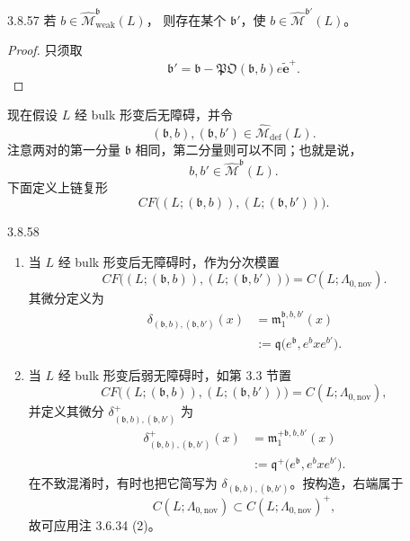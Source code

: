 \begin{corollary}{3.8.57}\label{cor:3-8-57}
若
$b\in\widehat{\mathcal M}^{\mathfrak b}_{\mathrm{weak}}(L)$，
则存在某个 $\mathfrak b'$，使
$b\in\widehat{\mathcal M}^{\mathfrak b'}(L)$。
\end{corollary}

\begin{proof}
只须取
\[
 \mathfrak b'
 =
 \mathfrak b-\mathfrak{PO}(\mathfrak b,b)e
 \widetilde{\mathbf e}^+.
\]
\end{proof}

现在假设 $L$ 经 bulk 形变后无障碍，并令
\[
 (\mathfrak b,b),(\mathfrak b,b')
 \in\widehat{\mathcal M}_{\mathrm{def}}(L).
\]
注意两对的第一分量 $\mathfrak b$ 相同，第二分量则可以不同；也就是说，
\[
 b,b'\in\widehat{\mathcal M}^{\mathfrak b}(L).
\]
下面定义上链复形
\[
 CF\bigl((L;(\mathfrak b,b)),(L;(\mathfrak b,b'))\bigr).
\]

\begin{definition}{3.8.58}\label{def:3-8-58}
\begin{enumerate}[label=\textup{(\arabic*)},leftmargin=2.8em]
\item 当 $L$ 经 bulk 形变后无障碍时，作为分次模置
\[
 CF\bigl((L;(\mathfrak b,b)),(L;(\mathfrak b,b'))\bigr)
 =
 C(L;\Lambda_{0,\mathrm{nov}}).
\]
其微分定义为
\begin{equation}
\begin{aligned}
 \delta_{(\mathfrak b,b),(\mathfrak b,b')}(x)
 &=
 \mathfrak m_1^{\mathfrak b,b,b'}(x)\\
 &:=
 \mathfrak q\bigl(
 e^{\mathfrak b},e^bxe^{b'}
 \bigr).
\end{aligned}
\tag{3.8.59.1}\label{eq:3-8-59-1}
\end{equation}

\item 当 $L$ 经 bulk 形变后弱无障碍时，如第 3.3 节置
\[
 CF\bigl((L;(\mathfrak b,b)),(L;(\mathfrak b,b'))\bigr)
 =
 C(L;\Lambda_{0,\mathrm{nov}}),
\]
并定义其微分
$\delta^+_{(\mathfrak b,b),(\mathfrak b,b')}$ 为
\begin{equation}
\begin{aligned}
 \delta^+_{(\mathfrak b,b),(\mathfrak b,b')}(x)
 &=
 \mathfrak m_1^{+\mathfrak b,b,b'}(x)\\
 &:=
 \mathfrak q^+\bigl(
 e^{\mathfrak b},e^bxe^{b'}
 \bigr).
\end{aligned}
\tag{3.8.59.2}\label{eq:3-8-59-2}
\end{equation}
在不致混淆时，有时也把它简写为
$\delta_{(\mathfrak b,b),(\mathfrak b,b')}$。按构造，右端属于
\[
 C(L;\Lambda_{0,\mathrm{nov}})
 \subset C(L;\Lambda_{0,\mathrm{nov}})^+,
\]
故可应用注 3.6.34 (2)。
\end{enumerate}
\end{definition}

